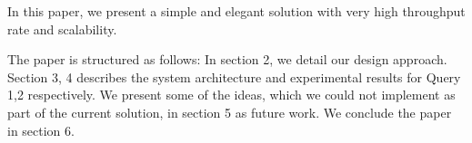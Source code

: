 In this paper, we present a simple and elegant solution with very high throughput rate and scalability.

The paper is structured as follows: In section 2, we detail our design approach. Section 3, 4 describes the system architecture and experimental results for Query 1,2 respectively. We present some of the ideas, which we could not implement as part of the current solution, in section 5 as future work. We conclude the paper in section 6.
